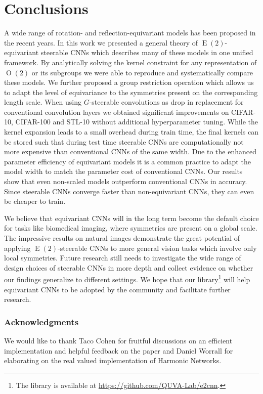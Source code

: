\documentclass{article}
\newcommand{\E}[1]{\ensuremath{\operatorname{E}(#1)}}
\renewcommand{\O}[1]{\ensuremath{\operatorname{O}(#1)}}
\newlength{\secBefore}
\newlength{\secAfter}
\begin{document}
 	

\vspace*{\secBefore}
\section{Conclusions}
\label{sec:conclusion}
\vspace*{\secAfter}


A wide range of rotation- and reflection-equivariant models has been proposed in the recent years.
In this work we presented a general theory of $\E2$-equivariant steerable CNNs which describes many of these models in one unified framework.
By analytically solving the kernel constraint for any representation of $\O2$ or its subgroups we were able to reproduce and systematically compare these models.
We further proposed a group restriction operation which allows us to adapt the level of equivariance to the symmetries present on the corresponding length scale.
When using $G$-steerable convolutions as drop in replacement for conventional convolution layers we obtained significant improvements on CIFAR-10, CIFAR-100 and STL-10 without additional hyperparameter tuning.
While the kernel expansion leads to a small overhead during train time, the final kernels can be stored such that during test time steerable CNNs are computationally not more expensive than conventional CNNs of the same width.
Due to the enhanced parameter efficiency of equivariant models it is a common practice to adapt the model width to match the parameter cost of conventional CNNs.
Our results show that even non-scaled models outperform conventional CNNs in accuracy.
Since steerable CNNs converge faster than non-equivariant CNNs, they can even be cheaper to train.

We believe that equivariant CNNs will in the long term become the default choice for tasks like biomedical imaging, where symmetries are present on a global scale.
The impressive results on natural images demonstrate the great potential of applying $\E2$-steerable CNNs to more general vision tasks which involve only local symmetries.
Future research still needs to investigate the wide range of design choices of steerable CNNs in more depth and collect evidence on whether our findings generalize to different settings.
We hope that our library\footnote{The library is available at \url{https://github.com/QUVA-Lab/e2cnn}.}
will help equivariant CNNs to be adopted by the community and facilitate further research.

 
	\vfill
	\subsubsection*{Acknowledgments}
	\vspace*{-1ex}
	{\small
	We would like to thank Taco Cohen for fruitful discussions on an efficient implementation and helpful feedback on the paper and Daniel Worrall for elaborating on the real valued implementation of Harmonic Networks.
	}
\end{document}
